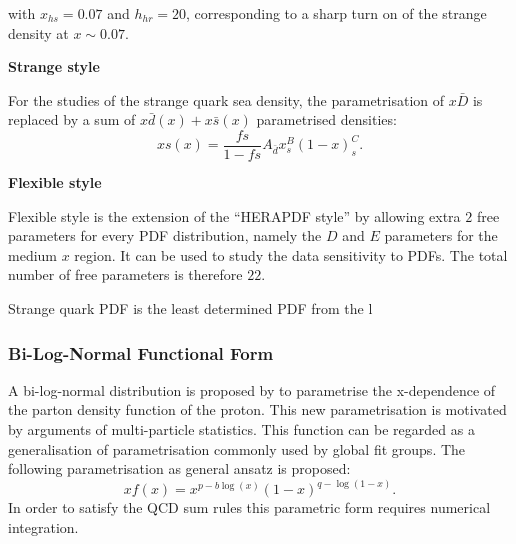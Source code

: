\begin{description}
with $x_{hs} = 0.07$ and $h_{hr} = 20$, corresponding to a sharp turn on of the strange density at $x\sim 0.07$.

\item \bf{Strange style}\rm


For the studies of the strange quark sea density, the parametrisation of $x\bar{D}$ is replaced by a sum of $x\bar{d}(x)+x\bar{s}(x)$ parametrised densities:
\begin{equation}
xs(x)=\frac{fs}{1-fs} A_{\bar{d}}x^B_s(1-x)^C_s .
\end{equation}

\item \bf{Flexible style}\rm

Flexible style is the extension of the ``HERAPDF style'' by allowing  extra $2$ free parameters for every PDF distribution, namely the $D$ and $E$ parameters for the medium $x$ region. It can be used to study the data sensitivity to PDFs. The total number of free parameters is therefore $22$.




Strange quark PDF is the least determined PDF from the l
\end{description}

\subsubsection{Bi-Log-Normal Functional Form}
\label{sec:log}
A bi-log-normal distribution is proposed by \cite{AndreSchoening} to parametrise the x-dependence of the parton density function of the proton.
This new parametrisation
is motivated by arguments of multi-particle statistics. 
This function can be regarded as a generalisation of parametrisation commonly used by global fit groups.
The following parametrisation as general ansatz is proposed:
\begin{equation}
xf(x)=x^{p-b\log(x)}(1-x)^{q-\log(1-x)}.
\label{eq:AS}
\end{equation}
In order to satisfy the QCD sum rules this parametric form requires numerical integration.

